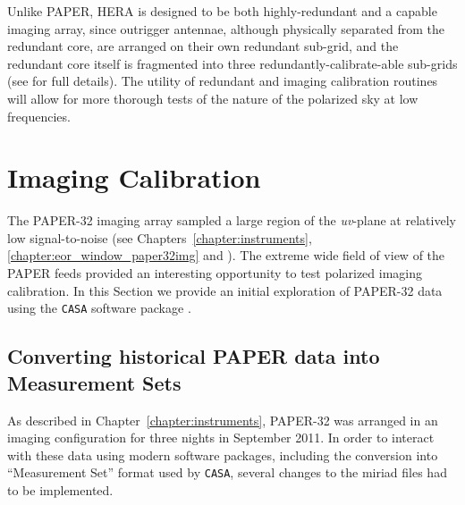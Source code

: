 Unlike PAPER, HERA is designed to be both highly-redundant and a capable imaging array, since outrigger antennae, although physically separated from the redundant core, are arranged on their own redundant sub-grid, and the redundant core itself is fragmented into three redundantly-calibrate-able sub-grids (see \citealt{Dillon.16} for full details). The utility of redundant and imaging calibration routines will allow for more thorough tests of the nature of the polarized sky at low frequencies.

\section{Imaging Calibration}
\label{sec:polcal_imagecal}

The PAPER-32 imaging array sampled a large region of the \textit{uv}-plane at relatively low signal-to-noise (see Chapters~\ref{chapter:instruments}, \ref{chapter:eor_window_paper32img} and \citet{Kohn.16}). The extreme wide field of view of the PAPER feeds provided an interesting opportunity to test polarized imaging calibration. In this Section we provide an initial exploration of PAPER-32 data using the {\tt CASA} software package \citep{casa}.

\subsection{Converting historical PAPER data into Measurement Sets}

As described in Chapter~\ref{chapter:instruments}, PAPER-32 was arranged in an imaging configuration for three nights in September 2011. In order to interact with these data using modern software packages, including the conversion into ``Measurement Set'' format used by {\tt CASA}, several changes to the {\sc miriad} files had to be implemented.

